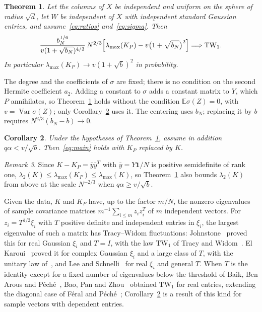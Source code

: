 \documentclass[11pt]{amsart}
\newtheorem{theorem}{Theorem}[section]
\newtheorem{corollary}[theorem]{Corollary}
\theoremstyle{remark}
\newtheorem{remark}[theorem]{Remark}
\numberwithin{equation}{section}
\newcommand{\EE}{\mathbb{E}}
\newcommand{\TW}{\mathrm{TW}_1}
\DeclareMathOperator{\Var}{Var}
\begin{document}
\begin{theorem}\label{thm:main}
Let the columns of $X$ be independent and uniform on the sphere of radius $\sqrt d$, let $W$ be independent of $X$ with independent standard Gaussian entries, and assume~\eqref{eq:ratios} and~\eqref{eq:sigma}. Then
\begin{equation}\label{eq:main}
\frac{b_N^{1/6}}{v(1+\sqrt{b_N})^{4/3}}\,N^{2/3}\Bigl[\lambda_{\max}(K_P)-v\bigl(1+\sqrt{b_N}\bigr)^2\Bigr]\Longrightarrow\TW.
\end{equation}
In particular $\lambda_{\max}(K_P)\to v(1+\sqrt b)^2$ in probability.
\end{theorem}

The degree and the coefficients of $\sigma$ are fixed; there is no condition on the second Hermite coefficient $a_2$. Adding a constant to $\sigma$ adds a constant matrix to $Y$, which $P$ annihilates, so Theorem~\ref{thm:main} holds without the condition $\EE\sigma(Z)=0$, with $v=\Var\sigma(Z)$; only Corollary~\ref{cor:K} uses it. The centering uses $b_N$; replacing it by $b$ requires $N^{2/3}(b_N-b)\to0$.

\begin{corollary}\label{cor:K}
Under the hypotheses of Theorem~\ref{thm:main}, assume in addition $q\alpha<v/\sqrt b$. Then~\eqref{eq:main} holds with $K_P$ replaced by $K$.
\end{corollary}

\begin{remark}\label{rem:scope}
Since $K-K_P=\bar y\bar y^{T}$ with $\bar y=Y\mathbf 1/N$ is positive semidefinite of rank one, $\lambda_2(K)\le\lambda_{\max}(K_P)\le\lambda_{\max}(K)$, so Theorem~\ref{thm:main} also bounds $\lambda_2(K)$ from above at the scale $N^{-2/3}$ when $q\alpha\ge v/\sqrt b$.
\end{remark}

Given the data, $K$ and $K_P$ have, up to the factor $m/N$, the nonzero eigenvalues of sample covariance matrices $m^{-1}\sum_{i\le m}z_iz_i^{T}$ of $m$ independent vectors. For $z_i=T^{1/2}\xi_i$ with $T$ positive definite and independent entries in $\xi_i$, the largest eigenvalue of such a matrix has Tracy--Widom fluctuations: Johnstone~\cite{Johnstone} proved this for real Gaussian $\xi_i$ and $T=I$, with the law $\TW$ of Tracy and Widom~\cite{TW}. El Karoui~\cite{ElKaroui} proved it for complex Gaussian $\xi_i$ and a large class of $T$, with the unitary law of~\cite{TW94}, and Lee and Schnelli~\cite{LS} for real $\xi_i$ and general $T$. When $T$ is the identity except for a fixed number of eigenvalues below the threshold of Baik, Ben Arous and P\'ech\'e~\cite{BBP}, Bao, Pan and Zhou~\cite[Corollary~1.7]{BPZ} obtained $\TW$ for real entries, extending the diagonal case of F\'eral and P\'ech\'e~\cite{FP}; Corollary~\ref{cor:K} is a result of this kind for sample vectors with dependent entries.
\end{document}
